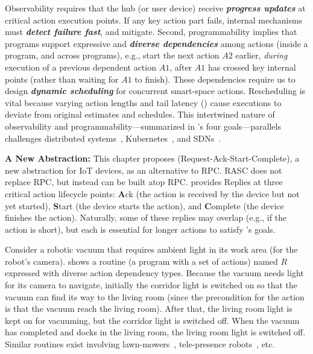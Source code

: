 Observability requires that the hub (or user device) receive \textbf{\textit{progress updates}} at critical action execution points. If any key action part fails, internal mechanisms must \textbf{\textit{detect failure fast}}, and mitigate. Second, programmability implies that programs support expressive and \textbf{\textit{diverse dependencies}} among actions (inside a program, and across programs), e.g., start the next action $A2$ earlier, {\it during} execution of a previous dependent action $A1$, after $A1$ has crossed key internal points (rather than waiting for $A1$ to finish). 
These dependencies require us to design \textbf{\textit{dynamic scheduling}} for concurrent smart-space actions. Rescheduling is vital because varying action lengths and tail latency () cause executions to deviate from original estimates and schedules.
This intertwined nature of observability and programmability---summarized in 's four goals---parallels challenges
distributed systems~\cite{omnitable,viperprobe}, Kubernetes~\cite{kubern8observability}, and SDNs~\cite{simon}.

\noindent \textbf{A New Abstraction:}
This chapter proposes {\it \abs} (Request-Ack-Start-Complete), a new abstraction for IoT devices, as an alternative to RPC. RASC does not replace RPC, but instead can be built atop RPC.
\abs{} provides Replies at three critical action lifecycle points: {\bf A}ck (the action is received by the device but not yet started), {\bf S}tart (the device starts the action), and {\bf C}omplete (the device finishes the action). Naturally, some of these replies may overlap   (e.g., if the action is short), but each is essential for longer actions 
to satisfy 's goals.

Consider a robotic vacuum that requires ambient light in its work area (for the robot's camera).
 shows a routine (a program with a set of actions) named $R$ expressed with diverse action dependency types. {Because the vacuum needs light for its camera to navigate, initially the corridor light is switched on so that the vacuum can find its way to the living room (since the precondition for the action is that the vacuum reach the living room). After that, the living room light is kept on for vacuuming, but the corridor light is switched off. When the vacuum has completed and docks in the living room, the living room light is switched off. } 
Similar routines exist involving lawn-mowers~\cite{santhoshini2024implementation}, tele-presence robots~\cite{tsui2011exploring}, etc.  


